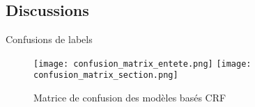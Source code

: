 \subsection{Discussions}
\begin{frame}{Confusions de labels}
\begin{figure}[!htb]
	\centering
	\texttt{[image: confusion\_matrix\_entete.png]} \hfill
	\texttt{[image: confusion\_matrix\_section.png]}
	\caption{Matrice de confusion des modèles basés CRF}
	\label{fig:structuration:matrice-confusion-entete}
\end{figure}
\end{frame}


